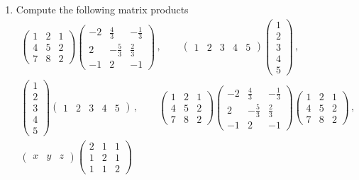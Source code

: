 


\begin{enumerate}

\item 
Compute the following matrix products
\begin{gather*}
\begin{pmatrix}1&2&1\\[1mm]4&5&2\\[1mm]7&8&2\end{pmatrix}
\begin{pmatrix}-2&\frac43&-\frac{1}{3}\\[1mm]2&-\frac53&\frac23\\[1mm]-1&2&-1\end{pmatrix}\, ,
\qquad
\begin{pmatrix}1&2&3&4&5\end{pmatrix}
\begin{pmatrix}1\\[1mm]2\\[1mm]3\\[1mm]4\\[1mm]5\end{pmatrix}\, ,
\\
\begin{pmatrix}1\\[1mm]2\\[1mm]3\\[1mm]4\\[1mm]5\end{pmatrix}\begin{pmatrix}1&2&3&4&5\end{pmatrix}\, ,\qquad
\begin{pmatrix}1&2&1\\[1mm]4&5&2\\[1mm]7&8&2\end{pmatrix}
\begin{pmatrix}-2&\frac43&-\frac{1}{3}\\[1mm]2&-\frac53&\frac23\\[1mm]-1&2&-1\end{pmatrix}
\begin{pmatrix}1&2&1\\[1mm]4&5&2\\[1mm]7&8&2\end{pmatrix}\, ,
\\
\begin{pmatrix}x & y &z\end{pmatrix}
\begin{pmatrix}
2& 1& 1 \\ 1 & 2 & 1 \\ 1 & 1 & 2

\end{pmatrix}
\end{gather*}
\end{enumerate}
